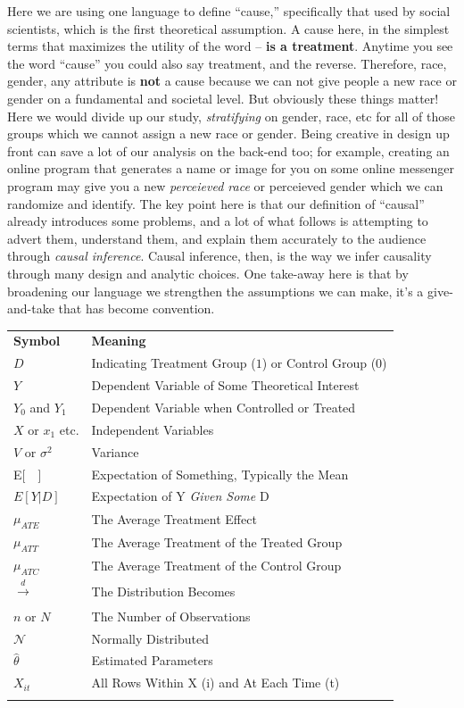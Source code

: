 \documentclass[12pt]{article}\usepackage[]{graphicx}\usepackage[]{color}
\begin{document}
\begin{flushleft}
Here we are using one language to define ``cause,'' specifically that used by social scientists, which is the first theoretical assumption. A cause here, in the simplest terms that maximizes the utility of the word -- \textbf{is a treatment}. Anytime you see the word ``cause'' you could also say treatment, and the reverse. Therefore, race, gender, any attribute is \textbf{not} a cause because we can not give people a new race or gender on a fundamental and societal level. But obviously these things matter! Here we would divide up our study, \textit{stratifying} on gender, race, etc for all of those groups which we cannot assign a new race or gender. Being creative in design up front can save a lot of our analysis on the back-end too; for example, creating an online program that generates a name or image for you on some online messenger program may give you a new \textit{perceieved race} or {perceieved gender} which we can randomize and identify. The key point here is that our definition of ``causal'' already introduces some problems, and a lot of what follows is attempting to advert them, understand them, and explain them accurately to the audience through \textit{causal inference}. Causal inference, then, is the way we infer causality through many design and analytic choices. One take-away here is that by broadening our language we strengthen the assumptions we can make, it's a give-and-take that has become convention. 

\begin{longtable}{ll}
\hline\noalign{\smallskip}
\textbf{Symbol} & \textbf{Meaning} \\
\noalign{\smallskip}\hline\noalign{\smallskip}
$D$ & Indicating Treatment Group ($1$) or Control Group ($0$)\\
$Y$ & Dependent Variable of Some Theoretical Interest        \\
$Y_0$ and $Y_1$ & Dependent Variable when Controlled or Treated\\
$X$ or $x_1$ etc. & Independent Variables\\
$V$ or $\sigma^2$ & Variance\\
E[~~]  & Expectation of Something, Typically the Mean\\
$E[Y |D]$ & Expectation of Y \textit{Given Some} D\\
$\mu_{ATE}$ & The Average Treatment Effect\\
$\mu_{ATT}$ & The Average Treatment of the Treated Group\\
$\mu_{ATC}$ & The Average Treatment of the Control Group\\
$\xrightarrow[]{d}$ & The Distribution Becomes\\
$n$ or $N$ & The Number of Observations\\
$\mathcal{N}$ & Normally Distributed\\
$\hat{\theta}$ & Estimated Parameters\\
$X_{it}$ & All Rows Within X (i) and At Each Time (t)\\
\noalign{\smallskip}\hline\noalign{\smallskip}
\end{longtable}



\end{flushleft}
\end{document}
